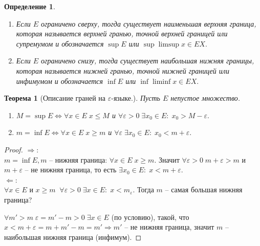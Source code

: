 \documentclass{article}
\newtheorem{Theorem}{Теорема}[section]
\newtheorem{Definition}{Определение}[section]
\begin{document}
\begin{Definition}
\begin{enumerate}
\item Если $E$ ограничено сверху, тогда существует наименьшая верхняя граница, которая называется верхней гранью, точной верхней границей или супремумом и обозначается $\sup E$ или $\sup\limsup{x\in E}X.$
\item Если $E$ ограничено снизу, тогда существует наибольшая нижняя границы, которая называется нижней гранью, точной нижней границей или инфимумом и обозначается $\inf E$ или $\inf\liminf{x\in E}X.$
\end{enumerate}
\end{Definition}

\begin{Theorem}[Описание граней на $\varepsilon$-языке.]
Пусть $E$ непустое множество. 
\begin{enumerate}
\item $M=\sup E \Leftrightarrow \forall x\in E\; x\leq M$ и $\forall\varepsilon>0\; \exists x_0\in E: \; x_0>M-\varepsilon.$
\item $m=\inf E \Leftrightarrow \forall x\in E \; x\geq m$ и $\forall\varepsilon\; \exists x_0\in E: \; x_0<m+\varepsilon.$
\end{enumerate}
\end{Theorem}
\begin{proof}
$\Rightarrow:$\\
$m=\inf E, m$ -- нижняя граница: $\forall x\in E\; x\geq m.$ Значит $\forall\varepsilon>0\; m+\varepsilon>m$ и $m+\varepsilon$ -- не нижняя граница, то есть $\exists x_0\in E: \; x<m+\varepsilon.$\\
$\Leftarrow:$\\
$\forall x\in E$ и $x\geq m \;\; \forall\varepsilon>0\; \exists x\in E: \; x<m_\varepsilon.$ Тогда $m$ -- самая большая нижняя граница?
\par $\forall m'>m \; \varepsilon=m'-m>0 \; \exists x\in E$ (по условию), такой, что $x<m+\varepsilon = m+m'-m=m' \Rightarrow m'$ -- не нижняя граница, значит $m$ -- наибольшая нижняя граница (инфимум).
\end{proof}
\end{document}
